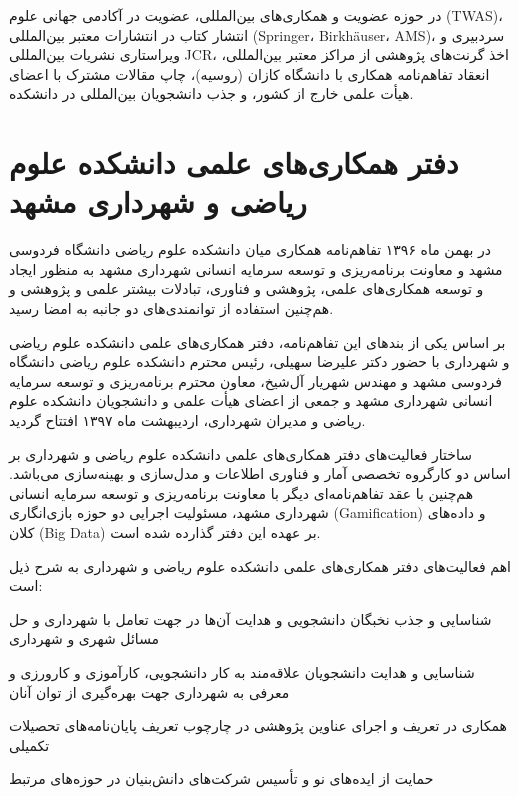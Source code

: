 \documentclass[
  letterpaper,
  DIV=11,
  numbers=noendperiod]{scrreprt}
\begin{document}
در حوزه عضویت و همکاری‌های بین‌المللی، عضویت در آکادمی جهانی علوم (TWAS)،
انتشار کتاب در انتشارات معتبر بین‌المللی (Springer، Birkhäuser، AMS)،
سردبیری و ویراستاری نشریات بین‌المللی JCR، اخذ گرنت‌های پژوهشی از مراکز
معتبر بین‌المللی، انعقاد تفاهم‌نامه همکاری با دانشگاه کازان (روسیه)، چاپ
مقالات مشترک با اعضای هیأت علمی خارج از کشور، و جذب دانشجویان بین‌المللی
در دانشکده.

\section{دفتر همکاری‌های علمی دانشکده علوم ریاضی و شهرداری
مشهد}\label{ux62fux641ux62aux631-ux647ux645ux6a9ux627ux631ux6ccux647ux627ux6cc-ux639ux644ux645ux6cc-ux62fux627ux646ux634ux6a9ux62fux647-ux639ux644ux648ux645-ux631ux6ccux627ux636ux6cc-ux648-ux634ux647ux631ux62fux627ux631ux6cc-ux645ux634ux647ux62f}

در بهمن ماه ۱۳۹۶ تفاهم‌نامه همکاری میان دانشکده علوم ریاضی دانشگاه فردوسی
مشهد و معاونت برنامه‌ریزی و توسعه سرمایه انسانی شهرداری مشهد به منظور
ایجاد و توسعه همکاری‌های علمی، پژوهشی و فناوری، تبادلات بیشتر علمی و
پژوهشی و هم‌چنین استفاده از توانمندی‌های دو جانبه به امضا رسید.

بر اساس یکی از بندهای این تفاهم‌نامه، دفتر همکاری‌های علمی دانشکده علوم
ریاضی و شهرداری با حضور دکتر علیرضا سهیلی، رئیس محترم دانشکده علوم ریاضی
دانشگاه فردوسی مشهد و مهندس شهریار آل‌شیخ، معاون محترم برنامه‌ریزی و توسعه
سرمایه انسانی شهرداری مشهد و جمعی از اعضای هیأت علمی و دانشجویان دانشکده
علوم ریاضی و مدیران شهرداری، اردیبهشت ماه ۱۳۹۷ افتتاح گردید.

ساختار فعالیت‌های دفتر همکاری‌های علمی دانشکده علوم ریاضی و شهرداری بر
اساس دو کارگروه تخصصی آمار و فناوری اطلاعات و مدل‌سازی و بهینه‌سازی
می‌باشد. هم‌چنین با عقد تفاهم‌نامه‌ای دیگر با معاونت برنامه‌ریزی و توسعه
سرمایه انسانی شهرداری مشهد، مسئولیت اجرایی دو حوزه بازی‌انگاری
(Gamification) و داده‌های کلان (Big Data) بر عهده این دفتر گذارده شده
است.

اهم فعالیت‌های دفتر همکاری‌های علمی دانشکده علوم ریاضی و شهرداری به شرح
ذیل است:

شناسایی و جذب نخبگان دانشجویی و هدایت آن‌ها در جهت تعامل با شهرداری و حل
مسائل شهری و شهرداری

شناسایی و هدایت دانشجویان علاقه‌مند به کار دانشجویی، کارآموزی و کارورزی و
معرفی به شهرداری جهت بهره‌گیری از توان آنان

همکاری در تعریف و اجرای عناوین پژوهشی در چارچوب تعریف پایان‌نامه‌های
تحصیلات تکمیلی

حمایت از ایده‌های نو و تأسیس شرکت‌های دانش‌بنیان در حوزه‌های مرتبط
\end{document}
